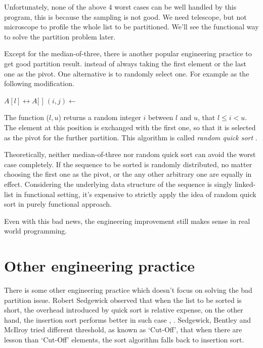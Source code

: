 \documentclass[UTF8]{article}
\begin{document}
Unfortunately, none of the above 4 worst cases can be well handled by this program, this is because
the sampling is not good. We need telescope, but not microscope to profile the whole list to be
partitioned. We'll see the functional way to solve the partition problem later.

Except for the median-of-three, there is another popular engineering practice to get good partition
result. instead of always taking the first element or the last one as the pivot. One alternative is
to randomly select one. For example as the following modification.

\begin{algorithmic}[1]
    \State {} $A[l] \leftrightarrow A[$  $]$
    \State $(i, j) \gets $ 
    \State {}
    \State {}
  \EndIf
\EndProcedure
\end{algorithmic}

The function ($l, u$) returns a random integer $i$ between $l$ and $u$, that
$l \leq i < u$. The element at this position is exchanged with the first one, so that it is
selected as the pivot for the further partition. This algorithm is called {\em random quick sort} \cite{CLRS}.

Theoretically, neither median-of-three nor random quick sort can avoid the worst case completely.
If the sequence to be sorted is randomly distributed, no matter choosing the first one as the
pivot, or the any other arbitrary one are equally in effect. Considering the underlying data
structure of the sequence is singly linked-list in functional setting, it's expensive to
strictly apply the idea of random quick sort in purely functional approach.

Even with this bad news, the engineering improvement still makes sense in real world programming.

\section{Other engineering practice}
There is some other engineering practice which doesn't focus on solving the bad partition issue.
Robert Sedgewick observed that when the list to be sorted is short, the overhead introduced by
quick sort is relative expense, on the other hand, the insertion sort performs better in such
case \cite{pearls}, \cite{3-way-part}. Sedgewick, Bentley and McIlroy tried different
threshold, as known as `Cut-Off', that when
there are lesson than `Cut-Off' elements, the sort algorithm falls back to insertion sort.
\end{document}
